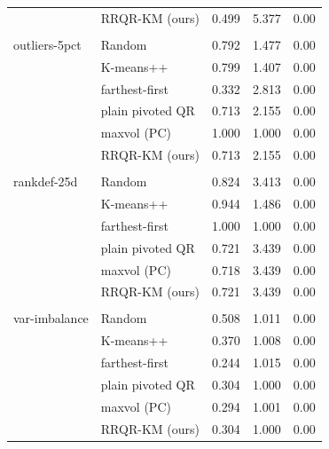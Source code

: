 \begin{table}[htbp]
{\begin{tabular}{llrrr}
 & RRQR-KM (ours) & 0.499 & 5.377 & 0.00 \\
\addlinespace \\
outliers-5pct & Random & 0.792 & 1.477 & 0.00 \\
 & K-means++ & 0.799 & 1.407 & 0.00 \\
 & farthest-first & 0.332 & 2.813 & 0.00 \\
 & plain pivoted QR & 0.713 & 2.155 & 0.00 \\
 & maxvol (PC) & 1.000 & 1.000 & 0.00 \\
 & RRQR-KM (ours) & 0.713 & 2.155 & 0.00 \\
\addlinespace \\
rankdef-25d & Random & 0.824 & 3.413 & 0.00 \\
 & K-means++ & 0.944 & 1.486 & 0.00 \\
 & farthest-first & 1.000 & 1.000 & 0.00 \\
 & plain pivoted QR & 0.721 & 3.439 & 0.00 \\
 & maxvol (PC) & 0.718 & 3.439 & 0.00 \\
 & RRQR-KM (ours) & 0.721 & 3.439 & 0.00 \\
\addlinespace \\
var-imbalance & Random & 0.508 & 1.011 & 0.00 \\
 & K-means++ & 0.370 & 1.008 & 0.00 \\
 & farthest-first & 0.244 & 1.015 & 0.00 \\
 & plain pivoted QR & 0.304 & 1.000 & 0.00 \\
 & maxvol (PC) & 0.294 & 1.001 & 0.00 \\
 & RRQR-KM (ours) & 0.304 & 1.000 & 0.00 \\
\bottomrule
\end{tabular}}
\end{table}
